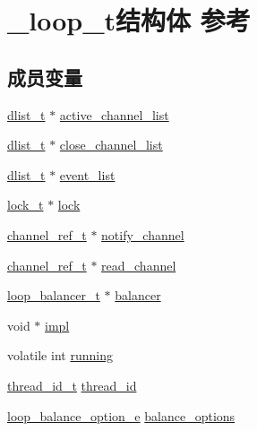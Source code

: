\hypertarget{a00025}{}\section{\+\_\+loop\+\_\+t结构体 参考}
\label{a00025}
\subsection*{成员变量}
\begin{DoxyCompactItemize}
\item 
\hyperlink{a00044_ad6644d67df4b4e3596c1eb12977d1d16_ad6644d67df4b4e3596c1eb12977d1d16}{dlist\+\_\+t} $\ast$ \hyperlink{a00025_a1d4033884e087124aff750c2fa3dd940_a1d4033884e087124aff750c2fa3dd940}{active\+\_\+channel\+\_\+list}
\item 
\hyperlink{a00044_ad6644d67df4b4e3596c1eb12977d1d16_ad6644d67df4b4e3596c1eb12977d1d16}{dlist\+\_\+t} $\ast$ \hyperlink{a00025_a58281719fe93904e20d8cf371cc92916_a58281719fe93904e20d8cf371cc92916}{close\+\_\+channel\+\_\+list}
\item 
\hyperlink{a00044_ad6644d67df4b4e3596c1eb12977d1d16_ad6644d67df4b4e3596c1eb12977d1d16}{dlist\+\_\+t} $\ast$ \hyperlink{a00025_add84738b5cc47a7bd7fda9a538d1a0b3_add84738b5cc47a7bd7fda9a538d1a0b3}{event\+\_\+list}
\item 
\hyperlink{a00044_ad3e00e0eb0c79dfd77ff2ff833f49c7d_ad3e00e0eb0c79dfd77ff2ff833f49c7d}{lock\+\_\+t} $\ast$ \hyperlink{a00025_ac70502c67ac58ef57d52fe62039390b7_ac70502c67ac58ef57d52fe62039390b7}{lock}
\item 
\hyperlink{a00044_a151271c9d188ef28d4d24bb81dcc1263_a151271c9d188ef28d4d24bb81dcc1263}{channel\+\_\+ref\+\_\+t} $\ast$ \hyperlink{a00025_a90c414783f752525e92edfc76763c44e_a90c414783f752525e92edfc76763c44e}{notify\+\_\+channel}
\item 
\hyperlink{a00044_a151271c9d188ef28d4d24bb81dcc1263_a151271c9d188ef28d4d24bb81dcc1263}{channel\+\_\+ref\+\_\+t} $\ast$ \hyperlink{a00025_a71352fb022c26178b2777934d9aebdfb_a71352fb022c26178b2777934d9aebdfb}{read\+\_\+channel}
\item 
\hyperlink{a00044_a649c7e850ab247b5f70ad27e335a129d_a649c7e850ab247b5f70ad27e335a129d}{loop\+\_\+balancer\+\_\+t} $\ast$ \hyperlink{a00025_a1f91106a5e601739f7cde876de5021f9_a1f91106a5e601739f7cde876de5021f9}{balancer}
\item 
void $\ast$ \hyperlink{a00025_a7fccdd254b563ddcfc44ae772dfe1d21_a7fccdd254b563ddcfc44ae772dfe1d21}{impl}
\item 
volatile int \hyperlink{a00025_abfb04cce945320081c75c19b6898a7cf_abfb04cce945320081c75c19b6898a7cf}{running}
\item 
\hyperlink{a00044_ad0ada5642d10ce71bdd90816182f9b79_ad0ada5642d10ce71bdd90816182f9b79}{thread\+\_\+id\+\_\+t} \hyperlink{a00025_aa52cbdff546a9e2868d2b3397e68d6dd_aa52cbdff546a9e2868d2b3397e68d6dd}{thread\+\_\+id}
\item 
\hyperlink{a00044_a6c87150c8f33855c3427c783480fd8ba_a6c87150c8f33855c3427c783480fd8ba}{loop\+\_\+balance\+\_\+option\+\_\+e} \hyperlink{a00025_a90fefc1ea1db1db789b46c689a31adbc_a90fefc1ea1db1db789b46c689a31adbc}{balance\+\_\+options}
\end{DoxyCompactItemize}


